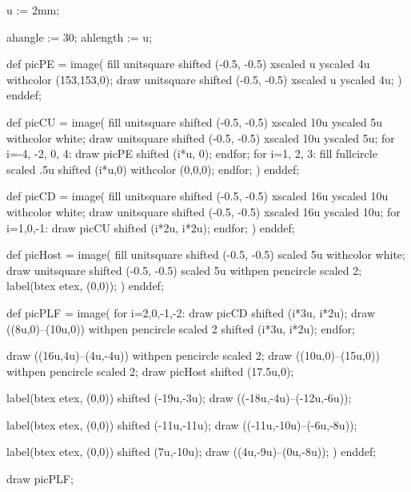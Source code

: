 u := 2mm;

ahangle := 30;
ahlength := u;

def picPE =
image(
fill unitsquare shifted (-0.5, -0.5) xscaled u yscaled 4u withcolor (153,153,0);
draw unitsquare shifted (-0.5, -0.5) xscaled u yscaled 4u;
)
enddef;

def picCU =
image(
fill unitsquare shifted (-0.5, -0.5) xscaled 10u yscaled 5u withcolor white;
draw unitsquare shifted (-0.5, -0.5) xscaled 10u yscaled 5u;
for i=-4, -2, 0, 4:
	draw picPE shifted (i*u, 0);
endfor;
for i=1, 2, 3:
	fill fullcircle scaled .5u shifted (i*u,0) withcolor (0,0,0);
endfor;
)
enddef;

def picCD =
image(
fill unitsquare shifted (-0.5, -0.5) xscaled 16u yscaled 10u withcolor white;
draw unitsquare shifted (-0.5, -0.5) xscaled 16u yscaled 10u;
for i=1,0,-1:
	draw picCU shifted (i*2u, i*2u);
endfor;
)
enddef;

def picHost =
image(
fill unitsquare shifted (-0.5, -0.5) scaled 5u withcolor white;
draw unitsquare shifted (-0.5, -0.5) scaled 5u withpen pencircle scaled 2;
label(btex  etex, (0,0));
)
enddef;

def picPLF =
image(
for i=2,0,-1,-2:
	draw picCD shifted (i*3u, i*2u);
	draw ((8u,0)--(10u,0)) withpen pencircle scaled 2 shifted (i*3u, i*2u);
endfor;

draw ((16u,4u)--(4u,-4u)) withpen pencircle scaled 2;
draw ((10u,0)--(15u,0)) withpen pencircle scaled 2;
draw picHost shifted (17.5u,0);

label(btex  etex, (0,0)) shifted (-19u,-3u);
draw ((-18u,-4u)--(-12u,-6u));

label(btex  etex, (0,0)) shifted (-11u,-11u);
draw ((-11u,-10u)--(-6u,-8u));

label(btex  etex, (0,0)) shifted (7u,-10u);
draw ((4u,-9u)--(0u,-8u));
)
enddef;

draw picPLF;

\stopreusableMPgraphic
